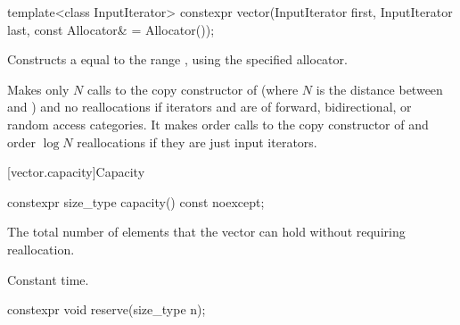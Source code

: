 \begin{itemdecl}
template<class InputIterator>
  constexpr vector(InputIterator first, InputIterator last,
                   const Allocator& = Allocator());
\end{itemdecl}

\begin{itemdescr}

\pnum
\effects
Constructs a  equal to the
range , using the specified allocator.

\pnum
\complexity
Makes only $N$
calls to the copy constructor of
(where $N$
is the distance between
and
)
and no reallocations if iterators  and  are of forward, bidirectional, or random access categories.
It makes order
calls to the copy constructor of
and order
$\log N$
reallocations if they are just input iterators.
\end{itemdescr}

[vector.capacity]{Capacity}

%
\begin{itemdecl}
constexpr size_type capacity() const noexcept;
\end{itemdecl}

\begin{itemdescr}
\pnum
\returns
The total number of elements that the vector can hold
without requiring reallocation.

\pnum
\complexity
Constant time.
\end{itemdescr}

%
\begin{itemdecl}
constexpr void reserve(size_type n);
\end{itemdecl}

